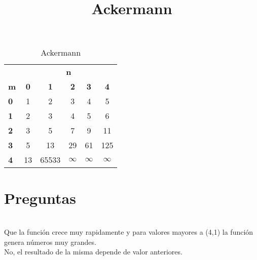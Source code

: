 
\title{Ackermann}


    \begin{table}
        \centering
        \begin{tabular}{l*{5}{c}}
            \toprule
            & \multicolumn{5}{c}{\textbf{n}} \\
            \cmidrule(lr){2-6}
            \textbf{m} & \textbf{0} & \textbf{1} & \textbf{2} & \textbf{3} & \textbf{4}\\
            \midrule
            \textbf{0} & 1  & 2     & 3  & 4  & 5   \\
            \textbf{1} & 2  & 3     & 4  & 5  & 6   \\
            \textbf{2} & 3  & 5     & 7  & 9  & 11  \\
            \textbf{3} & 5  & 13    & 29 & 61 & 125 \\
            \textbf{4} & 13 & 65533 & \textbf{$\infty$} & \textbf{$\infty$} & \textbf{$\infty$}\\
            \bottomrule
        \end{tabular}
        \caption{Ackermann}
        \label{table:1}
    \end{table}
\section{Preguntas}
\\
Que la función crece muy rapidamente y para valores mayores a (4,1) la función genera números muy grandes.
\\
No, el resultado de la misma depende de valor anteriores.


